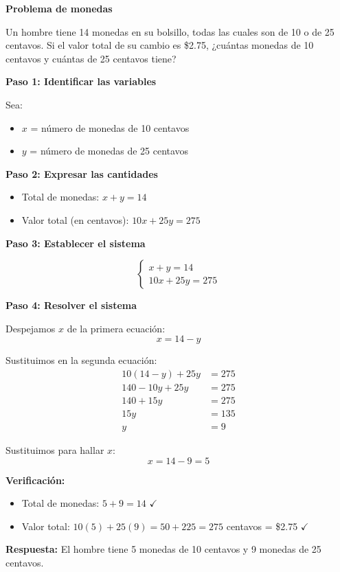 \begin{example}
\textbf{Problema de monedas}

Un hombre tiene 14 monedas en su bolsillo, todas las cuales son de 10 o de 25 centavos. Si el valor total de su cambio es \$2.75, ¿cuántas monedas de 10 centavos y cuántas de 25 centavos tiene?

\textbf{Paso 1: Identificar las variables}

Sea:
\begin{itemize}
    \item $x$ = número de monedas de 10 centavos
    \item $y$ = número de monedas de 25 centavos
\end{itemize}

\textbf{Paso 2: Expresar las cantidades}

\begin{itemize}
    \item Total de monedas: $x + y = 14$
    \item Valor total (en centavos): $10x + 25y = 275$
\end{itemize}

\textbf{Paso 3: Establecer el sistema}

$$\begin{cases}
x + y = 14 \\
10x + 25y = 275
\end{cases}$$

\textbf{Paso 4: Resolver el sistema}

Despejamos $x$ de la primera ecuación:
$$x = 14 - y$$

Sustituimos en la segunda ecuación:
\begin{align*}
10(14 - y) + 25y &= 275 \\
140 - 10y + 25y &= 275 \\
140 + 15y &= 275 \\
15y &= 135 \\
y &= 9
\end{align*}

Sustituimos para hallar $x$:
$$x = 14 - 9 = 5$$

\textbf{Verificación:}
\begin{itemize}
    \item Total de monedas: $5 + 9 = 14$ \quad $\checkmark$
    \item Valor total: $10(5) + 25(9) = 50 + 225 = 275$ centavos = \$2.75 \quad $\checkmark$
\end{itemize}

\textbf{Respuesta:} El hombre tiene 5 monedas de 10 centavos y 9 monedas de 25 centavos.
\end{example}
